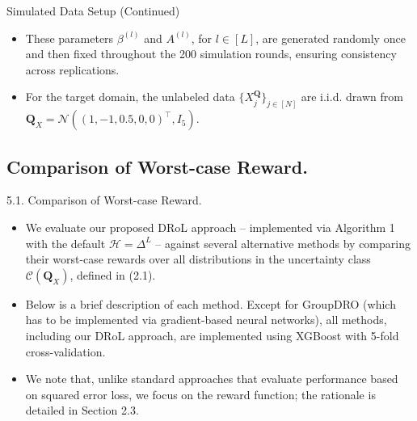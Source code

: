 \documentclass{beamer}
\begin{document}
\begin{frame}{Simulated Data Setup (Continued)}
    \begin{itemize}
        \item These parameters $\beta^{(l)}$ and $A^{(l)}$, for $l \in [L]$, are generated randomly once and then fixed throughout the 200 simulation rounds, ensuring consistency across replications.
        \item For the target domain, the unlabeled data $\{ X_{j}^{\mathbf{Q}} \}_{j \in [N]}$ are i.i.d. drawn from $\mathbf{Q}_{X} = \mathcal{N}\left( (1, -1, 0.5, 0, 0)^{\top}, I_{5} \right)$.
    \end{itemize}
\end{frame}

\subsection{Comparison of Worst-case Reward.}

\begin{frame}{5.1. Comparison of Worst-case Reward.}
    \begin{itemize}
        \item We evaluate our proposed DRoL approach – implemented via Algorithm 1 with the default $\mathcal{H} = \Delta^{L}$ – against several alternative methods by comparing their worst-case rewards over all distributions in the uncertainty class $\mathcal{C}(\mathbf{Q}_{X})$, defined in (2.1).
        \item Below is a brief description of each method. Except for GroupDRO (which has to be implemented via gradient-based neural networks), all methods, including our DRoL approach, are implemented using XGBoost with 5-fold cross-validation.
        \item We note that, unlike standard approaches that evaluate performance based on squared error loss, we focus on the reward function; the rationale is detailed in Section 2.3.
    \end{itemize}
\end{frame}
\end{document}
